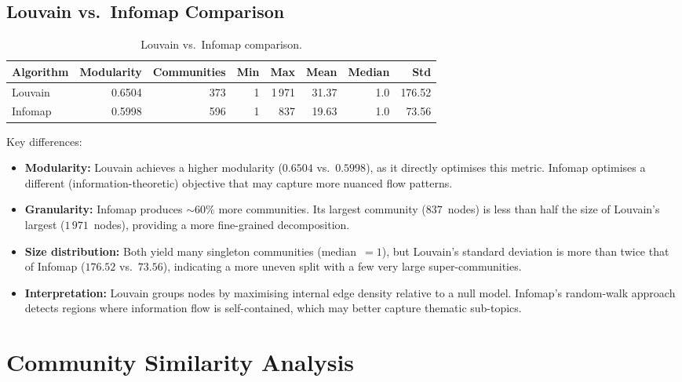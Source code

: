 \documentclass[12pt,a4paper]{article}
\begin{document}
\subsection{Louvain vs.\ Infomap Comparison}

\begin{table}[H]
\centering
\caption{Louvain vs.\ Infomap comparison.}
\label{tab:comparison}
\begin{tabular}{lrrrrrrr}
\toprule
\textbf{Algorithm} & \textbf{Modularity} & \textbf{Communities} & \textbf{Min} & \textbf{Max} & \textbf{Mean} & \textbf{Median} & \textbf{Std} \\
\midrule
Louvain & 0.6504 & 373 & 1 & 1\,971 & 31.37 & 1.0 & 176.52 \\
Infomap & 0.5998 & 596 & 1 & 837   & 19.63 & 1.0 & 73.56  \\
\bottomrule
\end{tabular}
\end{table}

Key differences:
\begin{itemize}
    \item \textbf{Modularity:} Louvain achieves a higher modularity ($0.6504$
          vs.\ $0.5998$), as it directly optimises this metric.  Infomap
          optimises a different (information-theoretic) objective that may
          capture more nuanced flow patterns.
    \item \textbf{Granularity:} Infomap produces $\sim$$60\%$ more communities.
          Its largest community ($837$~nodes) is less than half the size of
          Louvain's largest ($1\,971$~nodes), providing a more fine-grained
          decomposition.
    \item \textbf{Size distribution:} Both yield many singleton communities
          (median~$=1$), but Louvain's standard deviation is more than twice
          that of Infomap ($176.52$ vs.\ $73.56$), indicating a more uneven
          split with a few very large super-communities.
    \item \textbf{Interpretation:} Louvain groups nodes by maximising internal
          edge density relative to a null model.  Infomap's random-walk
          approach detects regions where information flow is self-contained,
          which may better capture thematic sub-topics.
\end{itemize}

\section{Community Similarity Analysis}
\end{document}
